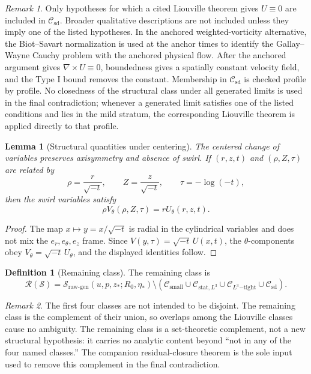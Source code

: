 \documentclass[11pt]{amsart}
\theoremstyle{plain}
\newtheorem{lemma}[lemma]{Lemma}
\theoremstyle{definition}
\newtheorem{definition}[definition]{Definition}
\theoremstyle{remark}
\newtheorem{remark}[remark]{Remark}
\numberwithin{equation}{section}
\newcommand{\calS}{\mathcal S}
\newcommand{\calR}{\mathcal R}
\newcommand{\calC}{\mathcal C}
\begin{document}
\begin{remark}
Only hypotheses for which a cited Liouville theorem gives \(U\equiv0\) are
included in \(\calC_{\mathrm{sd}}\).  Broader qualitative descriptions are
not included unless they imply one of the listed hypotheses.  In the
anchored weighted-vorticity alternative, the Biot--Savart normalization
is used at the anchor times to identify the Gallay--Wayne Cauchy problem with
the anchored physical flow.  After the anchored argument gives
\(\nabla\times U\equiv0\), boundedness gives a spatially constant velocity
field, and the Type I bound removes the constant.
Membership in \(\calC_{\mathrm{sd}}\) is checked profile by profile.  No
closedness of the structural class under all generated limits is used in the
final contradiction; whenever a generated limit satisfies one of the listed
conditions and lies in the mild stratum, the corresponding Liouville theorem is
applied directly to that profile.
\end{remark}

\begin{lemma}[Structural quantities under centering]
\label{p1:lem:structure-centering}
The centered change of variables preserves axisymmetry and absence of swirl.
If \((r,z,t)\) and \((\rho,Z,\tau)\) are related by
\[
   \rho=\frac r{\sqrt{-t}},\qquad Z=\frac z{\sqrt{-t}},
   \qquad \tau=-\log(-t),
\]
then the swirl variables satisfy
\[
   \rho V_\theta(\rho,Z,\tau)=rU_\theta(r,z,t).
\]
\end{lemma}

\begin{proof}
The map \(x\mapsto y=x/\sqrt{-t}\) is radial in the cylindrical variables and
does not mix the \(e_r,e_\theta,e_z\) frame.  Since
\(V(y,\tau)=\sqrt{-t}\,U(x,t)\), the \(\theta\)-components obey
\(V_\theta=\sqrt{-t}\,U_\theta\), and the displayed identities follow.
\end{proof}

\begin{definition}[Remaining class]\label{p1:def:remaining-class}
The remaining class is
\[
   \calR(\calS)
   =
   \calS_{\mathrm{raw\text{-}gen}}(u,p,z_*;R_0,\eta_*)
   \setminus
   \left(
      \calC_{\mathrm{small}}
      \cup
      \calC_{\mathrm{stat},L^3}
      \cup
      \calC_{L^3\mathrm{-tight}}
      \cup
      \calC_{\mathrm{sd}}
   \right).
\]
\end{definition}

\begin{remark}
The first four classes are not intended to be disjoint.  The remaining class is
the complement of their union, so overlaps among the Liouville classes cause no
ambiguity.  The remaining class is a set-theoretic complement, not a new
structural hypothesis: it carries no analytic content beyond ``not in any of
the four named classes.''  The companion residual-closure theorem
 is the sole input used to remove this complement in
the final contradiction.
\end{remark}
\end{document}
